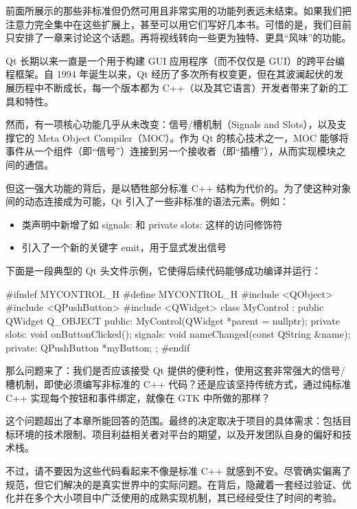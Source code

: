前面所展示的那些非标准但仍然可用且非常实用的功能列表远未结束。如果我们把注意力完全集中在这些扩展上，甚至可以用它们写好几本书。可惜的是，我们目前只安排了一章来讨论这个话题。再将视线转向一些更为独特、更具“风味”的功能。

Qt 长期以来一直是一个用于构建 GUI 应用程序（而不仅仅是 GUI）的跨平台编程框架。自 1994 年诞生以来，Qt 经历了多次所有权变更，但在其波澜起伏的发展历程中不断成长，每一个版本都为 C++（以及其它语言）开发者带来了新的工具和特性。

然而，有一项核心功能几乎从未改变：信号/槽机制（Signals and Slots），以及支撑它的 Meta Object Compiler（MOC）。作为 Qt 的核心技术之一，MOC 能够将事件从一个组件（即“信号”）连接到另一个接收者（即“插槽”），从而实现模块之间的通信。

但这一强大功能的背后，是以牺牲部分标准 C++ 结构为代价的。为了使这种对象间的动态连接成为可能，Qt 引入了一些非标准的语法元素。例如：

\begin{itemize}
\item 
类声明中新增了如 signals: 和 private slots: 这样的访问修饰符

\item 
引入了一个新的关键字 emit，用于显式发出信号
\end{itemize}

下面是一段典型的 Qt 头文件示例，它使得后续代码能够成功编译并运行：

\begin{cpp}
#ifndef MYCONTROL_H
#define MYCONTROL_H
#include <QObject>
#include <QPushButton>
#include <QWidget>
class MyControl : public QWidget {
  Q_OBJECT
public:
  MyControl(QWidget *parent = nullptr);
private slots:
  void onButtonClicked();
signals:
  void nameChanged(const QString &name);
private:
  QPushButton *myButton;
};
#endif
\end{cpp}

那么问题来了：我们是否应该接受 Qt 提供的便利性，使用这套非常强大的信号/槽机制，即使必须编写非标准的 C++ 代码？还是应该坚持传统方式，通过纯标准 C++ 实现每个按钮和事件绑定，就像在 GTK 中所做的那样？

这个问题超出了本章所能回答的范围。最终的决定取决于项目的具体需求：包括目标环境的技术限制、项目利益相关者对平台的期望，以及开发团队自身的偏好和技术栈。

不过，请不要因为这些代码看起来不像是标准 C++ 就感到不安。尽管确实偏离了规范，但它们解决的是真实世界中的实际问题。在背后，隐藏着一套经过验证、优化并在多个大小项目中广泛使用的成熟实现机制，其已经经受住了时间的考验。

